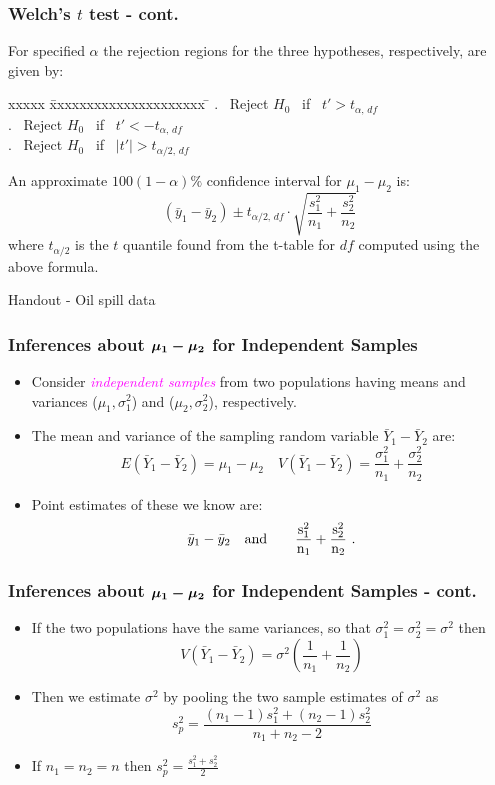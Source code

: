 \documentclass[xcolor=dvipsnames,12pt]{beamer}
\begin{document}
\begin{frame}
\frametitle{Welch's $t$ test - cont.}
For specified $\alpha$ the rejection regions for the three hypotheses, respectively, are given by:
\begin{tabbing}
xxxxx \= xxxxxxxxxxxxxxxxxxxxx \=  \kill
{}.  \ Reject $H_0$ \ if \ $t' > t_{\alpha,\,df}$ \\
. \ Reject $H_0$ \ if \ $t' < -t_{\alpha,\,df}$\\
. \ Reject $H_0$ \ if \ $|t'| > t_{\alpha/2,\,df}$
\end{tabbing}
 An approximate $100(1-\alpha)\%$ confidence interval for
 $\mu_1 - \mu_2$  is:
 $$(\bar{y}_1 - \bar{y}_2) \pm t_{\alpha/2,\,df}\cdot \sqrt{\frac{s_1^2}{n_1} +
\frac{s_2^2}{n_2}}$$
 where $t_{\alpha/2}$ is the $t$ quantile found from the t-table for $df$
computed using the above formula.
\end{frame}


\begin{frame}
Handout - Oil spill data
\end{frame}




\begin{frame}
\frametitle{Inferences about $\mbox{\boldmath$\mu_1 - \mu_2$}$ for
Independent Samples}
\begin{itemize}
\item Consider \textcolor{magenta}{\textit{independent samples}} from two populations having means and variances ($\mu_1, \sigma_1^2$) and ($\mu_2, \sigma_2^2$), respectively.
\item  The mean and variance of the sampling random variable 
$\bar{Y}_1 - \bar{Y}_2$ are:
$$
  E(\bar{Y}_1 - \bar{Y}_2) = \mu_1 - \mu_2 \quad
  V(\bar{Y}_1 - \bar{Y}_2) = \frac{\sigma_1^2}{n_1} + 
  \frac{\sigma_2^2}{n_2}
$$
\item  Point estimates of these we know are:
$$
  \bar{y}_1 - \bar{y}_2 \quad \rm{and} \quad \quad
  \frac{s_1^2}{n_1} + \frac{s_2^2}{n_2} \ .
$$
\end{itemize}
\end{frame}


\begin{frame}
\frametitle{Inferences about $\mbox{\boldmath$\mu_1 - \mu_2$}$ for
Independent Samples - cont.}
\begin{itemize}
\item  If the two populations have the same variances, so that $\sigma_1^2 = \sigma_2^2 = \sigma^2$ then
$$
  V(\bar{Y}_1 - \bar{Y}_2) = \sigma^2
  \left( \frac{1}{n_1} + \frac{1}{n_2} \right)
$$
\item  Then  we estimate $\sigma^2$ by pooling the two sample estimates
of $\sigma^2$ as
$$
  s_p^2 = \frac{(n_1-1)s_1^2 + (n_2-1)s_2^2}{n_1 + n_2 - 2} 
$$
\item If $  n_1 = n_2 = n $ then  $s_p^2 = \frac{s_1^2 + s_2^2}{2}$
\end{itemize}
\end{frame}
\end{document}
